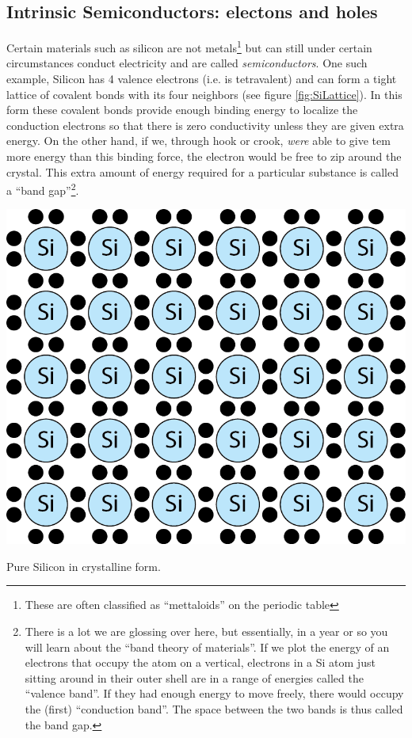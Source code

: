 \documentclass{tufte-book}
\begin{document}
\subsection{Intrinsic Semiconductors: electons and holes}
Certain materials such as silicon are not metals\footnote{These are often classified as ``mettaloids'' on the periodic table} but can still under certain circumstances conduct electricity and are called \textit{semiconductors}. One such example, Silicon has 4 valence electrons (i.e. is tetravalent) and can form a tight lattice of covalent bonds with its four neighbors (see figure \ref{fig:SiLattice}). In this form these covalent bonds provide enough binding energy to localize the conduction electrons so that there is zero conductivity unless they are given extra energy. On the other hand, if we, through hook or crook, \textit{were} able to give tem more energy than this binding force, the electron would be free to zip around the crystal. This extra amount of energy required for a particular substance is called a ``band gap''\footnote{There is a lot we are glossing over here, but essentially, in a year or so you will learn about the ``band theory of materials''. If we plot the energy of an electrons that occupy the atom on a vertical, electrons in a Si atom just sitting around in their outer shell are in a range of energies called the ``valence band''. If they had enough energy to move freely, there would occupy the (first) ``conduction band''. The space between the two bands is thus called the band gap.}. 

\begin{marginfigure}%
  \includegraphics[]{SiLattice}
  \caption{Pure Silicon in crystalline form.}
  \label{fig:SiLattice}
\end{marginfigure}
\end{document}
